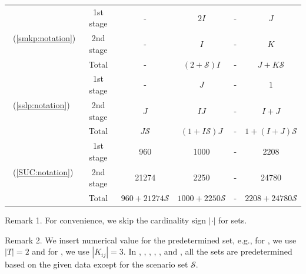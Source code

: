 \begin{table}[H]
{\begin{threeparttable}
\begin{tabular}{@{}lccccc@{}}
				\multirow{3}{*}{\smkp\ (\ref{smkp:notation})}   & 1st stage & -              & $2I$                               & -                    & $J$                       \\
				& 2nd stage & -              & $I$                                & -                    & $K$                       \\ \cmidrule(l){2-6} 
				& Total          & -              & $(2+\mathcal{S})I$                 & -                    & $J+K\mathcal{S}$          \\ \midrule
				\multirow{3}{*}{\sslp\ (\ref{sslp:notation})}   & 1st stage & -              & $J$                                & -                    & $1$                       \\
				& 2nd stage & $J$            & $IJ$                               & -                    & $I+J$                     \\ \cmidrule(l){2-6} 
				& Total          & $J\mathcal{S}$ & $(1+I\mathcal{S})J$                & -                    & $1+(I+J)\mathcal{S}$      \\ \midrule
				\multirow{3}{*}{\suc\ (\ref{SUC:notation})}   & 1st stage & 960               &   1000                                 &     -                 &  2208                         \\
				& 2nd stage & 21274               &     2250                               &   -                   & 24780                          \\ \cmidrule(l){2-6} 
				& Total          & $960+21274\mathcal{S}$                &  $1000+2250\mathcal{S}$                                  &  -                    &  $2208+24780\mathcal{S}$                         \\ \bottomrule
			\end{tabular}
			
			\begin{tablenotes}
				\small
				\item Remark 1. For convenience, we skip the cardinality sign $|\cdot|$ for sets.
				\item Remark 2. We insert numerical value for the predetermined set, e.g., for \sizes, we use $|T|=2$ and for \mptsps, we use $|K_{ij}|=3$. In \airlift, \cargo, \chem, \phone, \sdcp, and \suc, all the sets are predetermined based on the given data except for the scenario set $\mathcal{S}$.
			\end{tablenotes}
		\end{threeparttable}
	}
\end{table}

